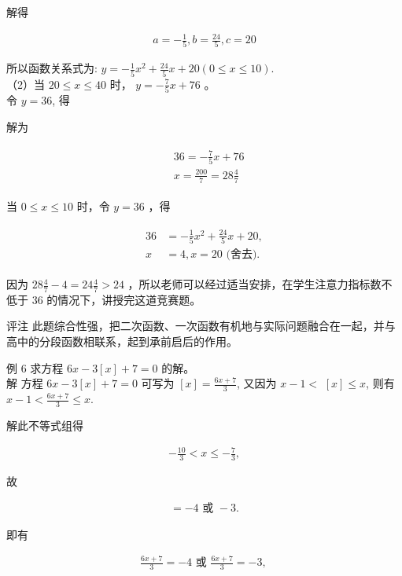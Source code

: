 \documentclass[10pt]{article}
\begin{document}
解得

\begin{align*}
a=-\frac{1}{5}, b=\frac{24}{5}, c=20
\end{align*}

所以函数关系式为: $y=-\frac{1}{5} x^{2}+\frac{24}{5} x+20(0 \leqslant x \leqslant 10)$.\\
（2）当 $20 \leqslant x \leqslant 40$ 时， $y=-\frac{7}{5} x+76$ 。\\
令 $y=36$, 得

解为

\begin{align*}
\begin{aligned}
& 36=-\frac{7}{5} x+76 \\
& x=\frac{200}{7}=28 \frac{4}{7}
\end{aligned}
\end{align*}

当 $0 \leqslant x \leqslant 10$ 时，令 $y=36$ ，得

\begin{align*}
\begin{aligned}
36 & =-\frac{1}{5} x^{2}+\frac{24}{5} x+20, \\
x & =4, x=20 \text { (舍去). }
\end{aligned}
\end{align*}

因为 $28 \frac{4}{7}-4=24 \frac{4}{7}>24$ ，所以老师可以经过适当安排，在学生注意力指标数不低于 36 的情况下，讲授完这道竞赛题。

评注 此题综合性强，把二次函数、一次函数有机地与实际问题融合在一起，并与高中的分段函数相联系，起到承前启后的作用。

例 6 求方程 $6 x-3[x]+7=0$ 的解。\\
解 方程 $6 x-3[x]+7=0$ 可写为 $[x]=\frac{6 x+7}{3}$, 又因为 $x-1<$ $[x] \leqslant x$, 则有 $x-1<\frac{6 x+7}{3} \leqslant x$.

解此不等式组得

\begin{align*}
-\frac{10}{3}<x \leqslant-\frac{7}{3},
\end{align*}

故

\begin{align*}
[x]=-4 \text { 或 }-3 .
\end{align*}

即有

\begin{align*}
\frac{6 x+7}{3}=-4 \text { 或 } \frac{6 x+7}{3}=-3 \text {, }
\end{align*}
\end{document}
